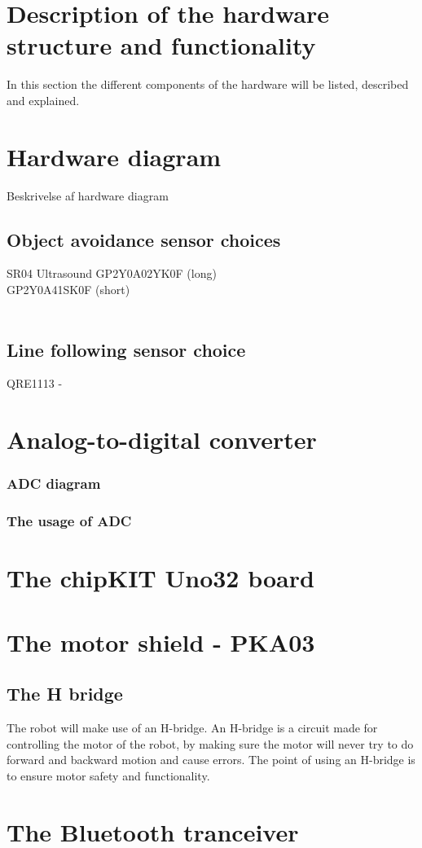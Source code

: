 \section{Description of the hardware structure and functionality}

In this section the different components of the hardware will be listed, described and explained.

\section{Hardware diagram}
Beskrivelse af hardware diagram


\subsection{Object avoidance sensor choices}
SR04 Ultrasound
GP2Y0A02YK0F (long) \\	
GP2Y0A41SK0F (short) \\
\\
\subsection{Line following sensor choice} 

QRE1113 - 
\section{Analog-to-digital converter}


\subsubsection{ADC diagram} 

\subsubsection{The usage of ADC}

\section{The chipKIT Uno32 board}


\section{The motor shield - PKA03}

\subsection{The H bridge}
The robot will make use of an H-bridge. An H-bridge is a circuit made for controlling the motor of the robot, by making sure the motor will never try to do forward and backward motion  and cause errors. The point of using an H-bridge is to ensure motor safety and functionality.

\section{The Bluetooth tranceiver}

